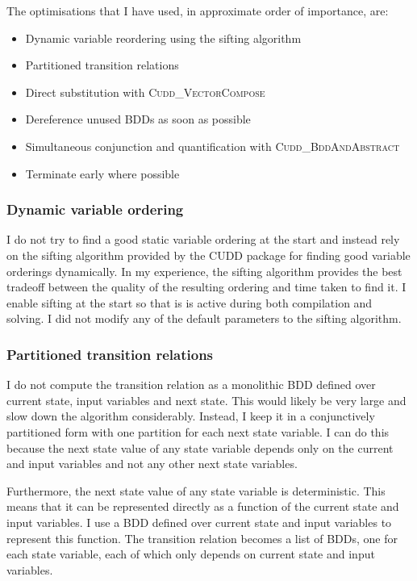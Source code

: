 The optimisations that I have used, in approximate order of importance, are:
\begin{itemize}
    \item Dynamic variable reordering using the sifting algorithm \cite{Rudell_1993}
    \item Partitioned transition relations \cite{Burch_91}
    \item Direct substitution with \textsc{Cudd\_VectorCompose}
    \item Dereference unused BDDs as soon as possible
    \item Simultaneous conjunction and quantification with \textsc{Cudd\_BddAndAbstract}
    \item Terminate early where possible
\end{itemize}

\subsubsection{Dynamic variable ordering}
I do not try to find a good static variable ordering at the start and instead rely on the sifting algorithm provided by the CUDD package for finding good variable orderings dynamically. In my experience, the sifting algorithm provides the best tradeoff between the quality of the resulting ordering and time taken to find it. I enable sifting at the start so that is is active during both compilation and solving. I did not modify any of the default parameters to the sifting algorithm.

\subsubsection{Partitioned transition relations}
I do not compute the transition relation as a monolithic BDD defined over current state, input variables and next state. This would likely be very large and slow down the algorithm considerably. Instead, I keep it in a conjunctively partitioned form with one partition for each next state variable. I can do this because the next state value of any state variable depends only on the current and input variables and not any other next state variables.

Furthermore, the next state value of any state variable is deterministic. This means that it can be represented directly as a function of the current state and input variables. I use a BDD defined over current state and input variables to represent this function. The transition relation becomes a list of BDDs, one for each state variable, each of which only depends on current state and input variables. 

